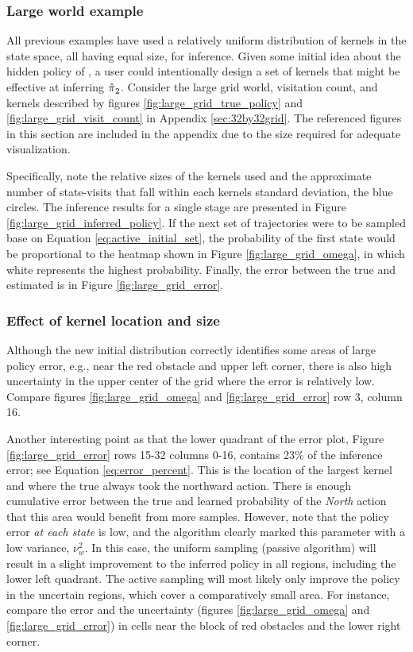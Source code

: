 \subsubsection{Large world example}

All previous examples have used a relatively uniform distribution of kernels in the state space, all having equal size, for inference. Given some initial idea about the hidden policy of , a user could intentionally design a set of kernels that might be effective at inferring $\hat{\pi_{}}_2$. Consider the large grid world, visitation count, and kernels described by figures \ref{fig:large_grid_true_policy} and \ref{fig:large_grid_visit_count} in Appendix \ref{sec:32by32grid}. The referenced figures in this section are included in the appendix due to the size required for adequate visualization.

Specifically, note the relative sizes of the kernels used and the approximate number of state-visits that fall within
each kernels standard deviation, the blue circles. The inference results for a single stage are presented in Figure
\ref{fig:large_grid_inferred_policy}. If the next set of trajectories were to be sampled base on Equation
\ref{eq:active_initial_set}, the probability of the first state would be proportional to the heatmap shown in Figure
\ref{fig:large_grid_omega}, in which white represents the highest probability.  Finally, the error between the true and
estimated  is in Figure \ref{fig:large_grid_error}.

\subsubsection{Effect of kernel location and size}

Although the new initial distribution correctly identifies some areas of large policy error, e.g., near the red obstacle
and upper left corner, there is also high uncertainty in the upper center of the grid where the error is relatively low.
Compare figures \ref{fig:large_grid_omega} and \ref{fig:large_grid_error} row 3, column 16.

Another interesting point as that the lower quadrant of the error plot, Figure \ref{fig:large_grid_error} rows 15-32
columns 0-16, contains 23\% of the inference error; see  Equation \ref{eq:error_percent}. This is the location of the
largest kernel and where the true  always took the northward action. There is enough cumulative error between
the true and learned probability of the \emph{North} action that this area would benefit from more samples. However,
note that the policy error \emph{at each state} is low, and the algorithm clearly marked this parameter with a low
variance, $\nu_w^2$. In this case, the uniform sampling (passive algorithm) will result in a slight improvement to the
inferred policy in all regions, including the lower left quadrant. The active sampling will most likely only improve the
policy in the uncertain regions, which cover a comparatively small area. For instance, compare the error and the
uncertainty (figures \ref{fig:large_grid_omega} and \ref{fig:large_grid_error}) in cells near the block of red obstacles
and the lower right corner.

